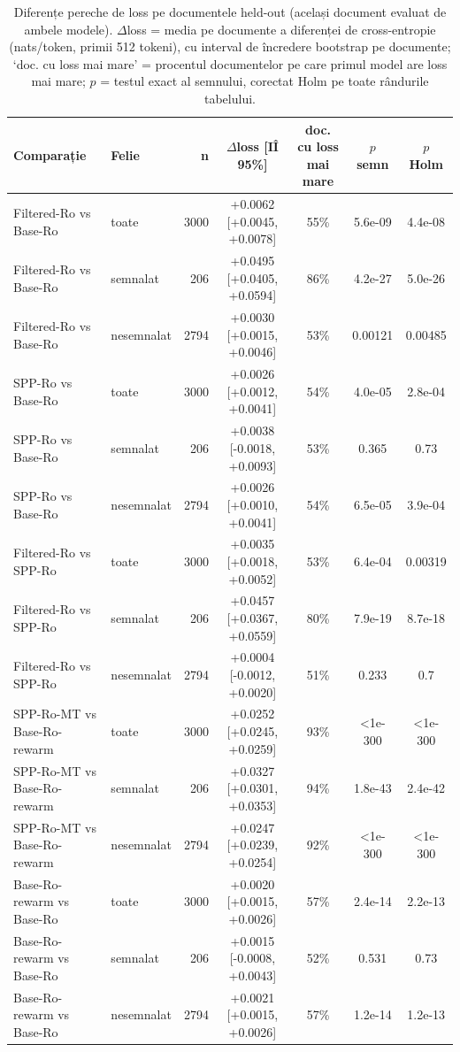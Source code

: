 \begin{table}[htbp]
\centering
\small
\begin{tabular}{l l r c c c c}
\toprule
\textbf{Comparație} & \textbf{Felie} & \textbf{n} & \textbf{$\Delta$loss [IÎ 95\%]} & \textbf{doc. cu loss mai mare} & \textbf{$p$ semn} & \textbf{$p$ Holm} \\
\midrule
Filtered-Ro vs Base-Ro & toate & 3000 & +0.0062 [+0.0045, +0.0078] & 55\% & 5.6e-09 & 4.4e-08 \\
Filtered-Ro vs Base-Ro & semnalat & 206 & +0.0495 [+0.0405, +0.0594] & 86\% & 4.2e-27 & 5.0e-26 \\
Filtered-Ro vs Base-Ro & nesemnalat & 2794 & +0.0030 [+0.0015, +0.0046] & 53\% & 0.00121 & 0.00485 \\
SPP-Ro vs Base-Ro & toate & 3000 & +0.0026 [+0.0012, +0.0041] & 54\% & 4.0e-05 & 2.8e-04 \\
SPP-Ro vs Base-Ro & semnalat & 206 & +0.0038 [-0.0018, +0.0093] & 53\% & 0.365 & 0.73 \\
SPP-Ro vs Base-Ro & nesemnalat & 2794 & +0.0026 [+0.0010, +0.0041] & 54\% & 6.5e-05 & 3.9e-04 \\
Filtered-Ro vs SPP-Ro & toate & 3000 & +0.0035 [+0.0018, +0.0052] & 53\% & 6.4e-04 & 0.00319 \\
Filtered-Ro vs SPP-Ro & semnalat & 206 & +0.0457 [+0.0367, +0.0559] & 80\% & 7.9e-19 & 8.7e-18 \\
Filtered-Ro vs SPP-Ro & nesemnalat & 2794 & +0.0004 [-0.0012, +0.0020] & 51\% & 0.233 & 0.7 \\
SPP-Ro-MT vs Base-Ro-rewarm & toate & 3000 & +0.0252 [+0.0245, +0.0259] & 93\% & <1e-300 & <1e-300 \\
SPP-Ro-MT vs Base-Ro-rewarm & semnalat & 206 & +0.0327 [+0.0301, +0.0353] & 94\% & 1.8e-43 & 2.4e-42 \\
SPP-Ro-MT vs Base-Ro-rewarm & nesemnalat & 2794 & +0.0247 [+0.0239, +0.0254] & 92\% & <1e-300 & <1e-300 \\
Base-Ro-rewarm vs Base-Ro & toate & 3000 & +0.0020 [+0.0015, +0.0026] & 57\% & 2.4e-14 & 2.2e-13 \\
Base-Ro-rewarm vs Base-Ro & semnalat & 206 & +0.0015 [-0.0008, +0.0043] & 52\% & 0.531 & 0.73 \\
Base-Ro-rewarm vs Base-Ro & nesemnalat & 2794 & +0.0021 [+0.0015, +0.0026] & 57\% & 1.2e-14 & 1.2e-13 \\
\bottomrule
\end{tabular}
\caption{Diferențe pereche de loss pe documentele held-out (același document evaluat de ambele modele). $\Delta$loss = media pe documente a diferenței de cross-entropie (nats/token, primii 512 tokeni), cu interval de încredere bootstrap pe documente; `doc. cu loss mai mare' = procentul documentelor pe care primul model are loss mai mare; $p$ = testul exact al semnului, corectat Holm pe toate rândurile tabelului.}
\label{tab:thesis_alignment_paired}
\end{table}

